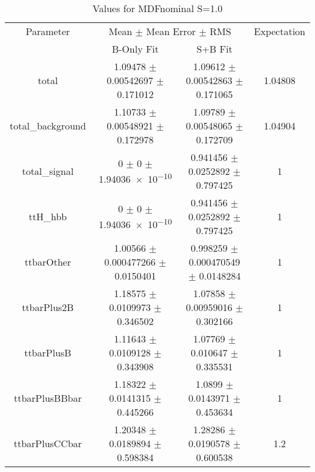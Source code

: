 \begin{table}
\centering
\caption{Values for MDFnominal S=1.0}
\begin{tabular}{cccc}
\toprule
Parameter & \multicolumn{2}{c}{Mean $\pm$ Mean Error $\pm$ RMS} & Expectation\\
 & B-Only Fit & S+B Fit & \\
\midrule
total & \num{1.09478} $\pm$ \num{0.00542697} $\pm$ \num{0.171012} & \num{1.09612} $\pm$ \num{0.00542863} $\pm$ \num{0.171065} & \num{1.04808}\\
total\_background & \num{1.10733} $\pm$ \num{0.00548921} $\pm$ \num{0.172978} & \num{1.09789} $\pm$ \num{0.00548065} $\pm$ \num{0.172709} & \num{1.04904}\\
total\_signal & \num{0} $\pm$ \num{0} $\pm$ \num{1.94036e-10} & \num{0.941456} $\pm$ \num{0.0252892} $\pm$ \num{0.797425} & \num{1}\\
ttH\_hbb & \num{0} $\pm$ \num{0} $\pm$ \num{1.94036e-10} & \num{0.941456} $\pm$ \num{0.0252892} $\pm$ \num{0.797425} & \num{1}\\
ttbarOther & \num{1.00566} $\pm$ \num{0.000477266} $\pm$ \num{0.0150401} & \num{0.998259} $\pm$ \num{0.000470549} $\pm$ \num{0.0148284} & \num{1}\\
ttbarPlus2B & \num{1.18575} $\pm$ \num{0.0109973} $\pm$ \num{0.346502} & \num{1.07858} $\pm$ \num{0.00959016} $\pm$ \num{0.302166} & \num{1}\\
ttbarPlusB & \num{1.11643} $\pm$ \num{0.0109128} $\pm$ \num{0.343908} & \num{1.07769} $\pm$ \num{0.010647} $\pm$ \num{0.335531} & \num{1}\\
ttbarPlusBBbar & \num{1.18322} $\pm$ \num{0.0141315} $\pm$ \num{0.445266} & \num{1.0899} $\pm$ \num{0.0143971} $\pm$ \num{0.453634} & \num{1}\\
ttbarPlusCCbar & \num{1.20348} $\pm$ \num{0.0189894} $\pm$ \num{0.598384} & \num{1.28286} $\pm$ \num{0.0190578} $\pm$ \num{0.600538} & \num{1.2}\\
\bottomrule
\end{tabular}
\end{table}